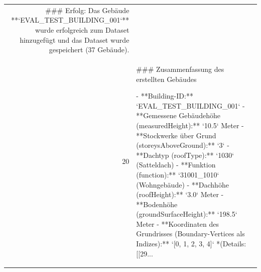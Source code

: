 \documentclass[a4paper,11pt]{article}
\begin{document}
\begin{table}[ht]
\begin{tabular}{r p{12cm}}
\#\#\# Erfolg:
Das Gebäude **`EVAL\_TEST\_BUILDING\_001`** wurde erfolgreich zum Dataset hinzugefügt und das Dataset wurde gespeichert (37 Gebäude). \\
20 & \#\#\# Zusammenfassung des erstellten Gebäudes

- **Building-ID:** `EVAL\_TEST\_BUILDING\_001`
- **Gemessene Gebäudehöhe (measuredHeight):** `10.5` Meter
- **Stockwerke über Grund (storeysAboveGround):** `3`
- **Dachtyp (roofType):** `1030` (Satteldach)
- **Funktion (function):** `31001\_1010` (Wohngebäude)
- **Dachhöhe (roofHeight):** `3.0` Meter
- **Bodenhöhe (groundSurfaceHeight):** `198.5` Meter
- **Koordinaten des Grundrisses (Boundary-Vertices als Indizes):**
  `[0, 1, 2, 3, 4]`
  *(Details: [[29... \\
\hline
\end{tabular}
\end{table}

\clearpage
\end{document}
